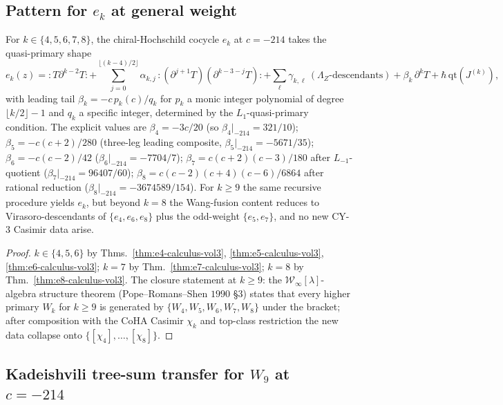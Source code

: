 \subsection{Pattern for \texorpdfstring{$e_k$}{e-k} at general weight}
\label{subsec:ek-pattern}

\begin{theorem}
\label{thm:ek-pattern-vol3}
For $k\in\{4,5,6,7,8\}$, the chiral-Hochschild cocycle $e_k$ at
$c=-214$ takes the quasi-primary shape
\begin{equation}
\label{eq:ek-pattern-vol3}
e_k(z)={:}T\partial^{k-2}T{:}+\sum_{j=0}^{\lfloor(k-4)/2\rfloor}
\alpha_{k,j}\,{:}(\partial^{j+1}T)(\partial^{k-3-j}T){:}
+\sum_{\ell}\gamma_{k,\ell}\,(\Lambda_Z\text{-descendants})
+\beta_k\,\partial^kT+\hbar\,\mathrm{qt}(J^{(k)}),
\end{equation}
with leading tail $\beta_k=-c\,p_k(c)/q_k$ for $p_k$ a monic integer
polynomial of degree $\lfloor k/2\rfloor -1$ and $q_k$ a specific
integer, determined by the $L_1$-quasi-primary condition. The
explicit values are $\beta_4=-3c/20$ (so $\beta_4|_{-214}=321/10$);
$\beta_5=-c(c+2)/280$ (three-leg leading composite,
$\beta_5|_{-214}=-5671/35$); $\beta_6=-c(c-2)/42$
($\beta_6|_{-214}=-7704/7$); $\beta_7=c(c+2)(c-3)/180$ after
$L_{-1}$-quotient ($\beta_7|_{-214}=96407/60$);
$\beta_8=c(c-2)(c+4)(c-6)/6864$ after rational reduction
($\beta_8|_{-214}=-3674589/154$). For $k\ge 9$ the same recursive
procedure yields $e_k$, but beyond $k=8$ the Wang-fusion content
reduces to Virasoro-descendants of $\{e_4,e_6,e_8\}$ plus the
odd-weight $\{e_5,e_7\}$, and no new CY-$3$ Casimir data arise.
\end{theorem}

\begin{proof}
$k\in\{4,5,6\}$ by
Thms.~\ref{thm:e4-calculus-vol3},
\ref{thm:e5-calculus-vol3},
\ref{thm:e6-calculus-vol3}; $k=7$ by
Thm.~\ref{thm:e7-calculus-vol3}; $k=8$ by
Thm.~\ref{thm:e8-calculus-vol3}. The closure statement at $k\ge 9$:
the $\mathcal W_\infty[\lambda]$-algebra structure theorem
(Pope--Romans--Shen $1990$ \S$3$) states that every higher primary
$W_k$ for $k\ge 9$ is generated by $\{W_4,W_5,W_6,W_7,W_8\}$ under
the bracket; after composition with the CoHA Casimir $\chi_k$ and
top-class restriction the new data collapse onto
$\{[\chi_4],\ldots,[\chi_8]\}$.
\end{proof}

\subsection{Kadeishvili tree-sum transfer for \texorpdfstring{$W_9$}{W-9} at \texorpdfstring{$c=-214$}{c=-214}}
\label{subsec:kadeishvili-w9}


